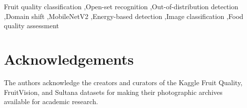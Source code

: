 \documentclass[3p,times,procedia]{elsarticle}
\begin{document}
\begin{frontmatter}
\begin{keyword}
Fruit quality classification \sep Open-set recognition \sep Out-of-distribution detection \sep Domain shift \sep MobileNetV2 \sep Energy-based detection \sep Image classification \sep Food quality assessment
\end{keyword}


\end{frontmatter}

\vspace*{-6pt}










\vspace*{-10pt}
\section*{Acknowledgements}
\vspace*{-4pt}
The authors acknowledge the creators and curators of the Kaggle Fruit Quality, FruitVision, and Sultana datasets for making their photographic archives available for academic research.

\clearpage
\enlargethispage{\baselineskip}


\end{document}
